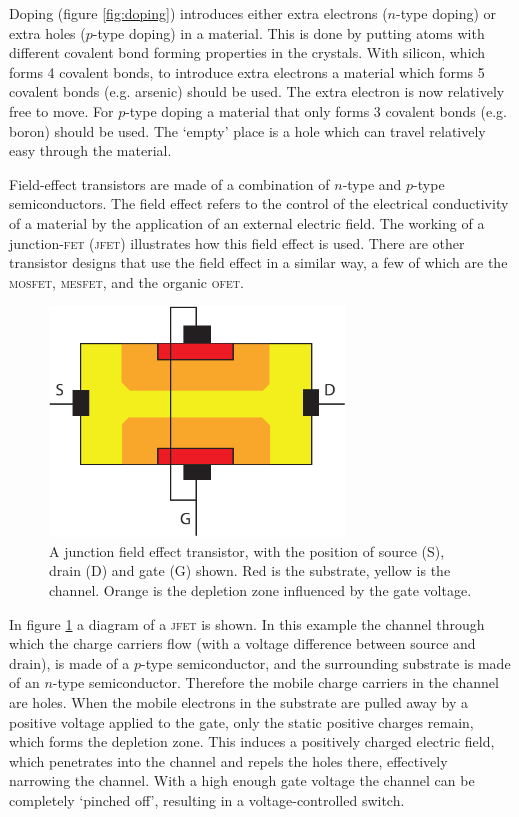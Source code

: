 Doping (figure \ref{fig:doping}) introduces either extra electrons ($n$-type doping) or extra holes ($p$-type doping) in a material. This is done by putting atoms with different covalent bond forming properties in the crystals. With silicon, which forms 4 covalent bonds, to introduce extra electrons a material which forms 5 covalent bonds (e.g. arsenic) should be used. The extra electron is now relatively free to move. For $p$-type doping a material that only forms 3 covalent bonds (e.g. boron) should be used. The `empty' place is a hole which can travel relatively easy through the material.

Field-effect transistors are made of a combination of $n$-type and $p$-type semiconductors. The field effect refers to the control of the electrical conductivity of a material by the application of an external electric field. The working of a junction-\textsc{fet} (\textsc{jfet}) illustrates how this field effect is used. There are other transistor designs that use the field effect in a similar way, a few of which are the \textsc{mosfet}, \textsc{mesfet}, and the organic \textsc{ofet}.

\begin{figure}[!ht]
 \begin{center}
  \includegraphics[width=0.7\textwidth]{jfet}
  \caption{A junction field effect transistor, with the position of source (S), drain (D) and gate (G) shown. Red is the substrate, yellow is the channel. Orange is the depletion zone influenced by the gate voltage.}
  \label{fig:JFET}
 \end{center}
\end{figure}

In figure \ref{fig:JFET} a diagram of a \textsc{jfet} is shown. In this example the channel through which the charge carriers flow (with a voltage difference between source and drain), is made of a $p$-type semiconductor, and the surrounding substrate is made of an $n$-type semiconductor. Therefore the mobile charge carriers in the channel are holes. When the mobile electrons in the substrate are pulled away by a positive voltage applied to the gate, only the static positive charges remain, which forms the depletion zone. This induces a positively charged electric field, which penetrates into the channel and repels the holes there, effectively narrowing the channel. With a high enough gate voltage the channel can be completely `pinched off', resulting in a voltage-controlled switch.

